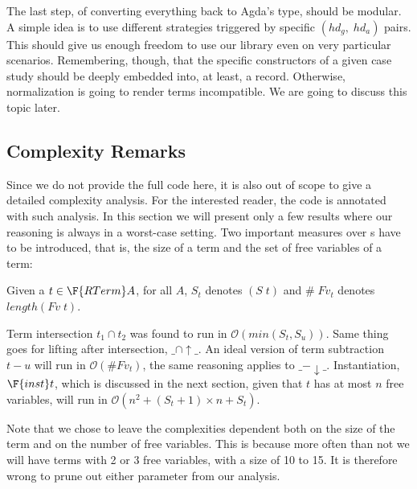 The last step, of converting everything back to Agda's  type, should 
be modular. A simple idea is to use different strategies triggered by 
specific $(hd_g,\;hd_a)$ pairs. This should give us enough freedom to use our 
library even on very particular scenarios. Remembering, though, that the 
specific constructors of a given case study should be deeply embedded into, 
at least, a record. Otherwise, normalization is going to render terms 
incompatible. We are going to discuss this topic later.

\subsection{Complexity Remarks}
\label{sec:basiccomplexity}

Since we do not provide the full code here, it is also out of 
scope to give a detailed complexity analysis. For the interested reader, the 
code is annotated with such analysis. In this section we will present only a 
few results where our reasoning is always in a worst-case setting.
Two important measures over s have to be introduced, that is,
the size of a term and the set of free variables of a term:

\newcommand{\bigO}[1]{\mathcal{O}(#1)}
\begin{minipage}[t]{0.45\textwidth}
\end{minipage}
\begin{minipage}[t]{0.45\textwidth}
\end{minipage}

Given a $t \in \F{RTerm} A$, for all $A$, $S_t$ denotes $(S\; t)$ and 
$\#\;Fv_t$ denotes $length (Fv\;t)$. 

Term intersection $t_1 \cap t_2$ was found to run in $\bigO{min(S_t, S_u)}$.
Same thing goes for lifting after intersection, $\_\cap\uparrow\_$. 
An ideal version of term subtraction $t - u$ will run in $\bigO{\# Fv_t}$,
the same reasoning applies to $\_-\downarrow\_$.
Instantiation, $\F{inst }t$, which is discussed in the next section, given
that $t$ has at most $n$ free variables, will run in 
$\bigO{n^2 + (S_t + 1)\times n + S_t}$.

Note that we chose to leave the complexities dependent both on the size of the term
and on the number of free variables. This is because more often than not we will have
terms with 2 or 3 free variables, with a size of 10 to 15. It is therefore wrong
to prune out either parameter from our analysis.

